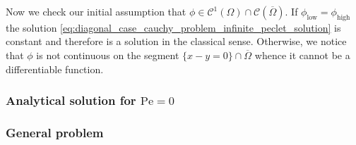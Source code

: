 Now we check our initial assumption that $\phi \in \mathcal{C}^1(\Omega) \cap \mathcal{C}(\overline{\Omega})$. If $\phi_\text{low} = \phi_\text{high}$ the solution \eqref{eq:diagonal_case_cauchy_problem_infinite_peclet_solution} is constant and therefore is a solution in the classical sense. Otherwise, we notice that $\phi$ is not continuous on the segment $\{ x - y = 0 \} \cap \overline{\Omega}$ whence it cannot be a differentiable function. 

\subsubsection{Analytical solution for \texorpdfstring{$\mathrm{Pe} = 0$}{zero Péclet's number}}

\subsubsection{General problem}